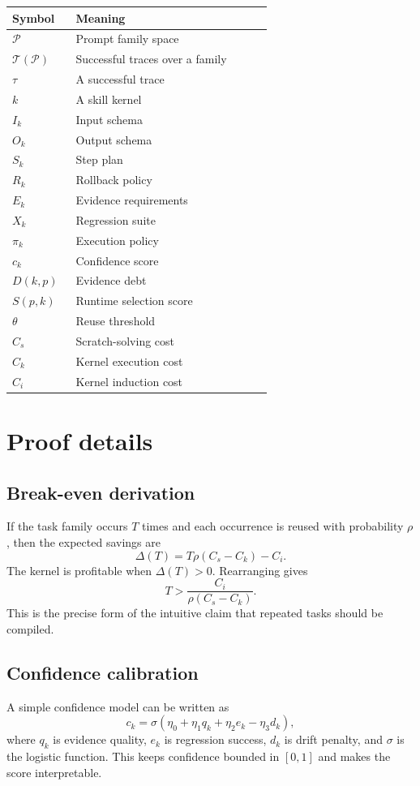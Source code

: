 \documentclass{article}
\begin{document}
\begin{longtable}{p{0.22\linewidth} p{0.68\linewidth}}
\toprule
Symbol & Meaning \\
\midrule
$\mathcal{P}$ & Prompt family space \\
$\mathcal{T}(\mathcal{P})$ & Successful traces over a family \\
$\tau$ & A successful trace \\
$k$ & A skill kernel \\
$I_k$ & Input schema \\
$O_k$ & Output schema \\
$S_k$ & Step plan \\
$R_k$ & Rollback policy \\
$E_k$ & Evidence requirements \\
$X_k$ & Regression suite \\
$\pi_k$ & Execution policy \\
$c_k$ & Confidence score \\
$D(k,p)$ & Evidence debt \\
$S(p,k)$ & Runtime selection score \\
$\theta$ & Reuse threshold \\
$C_s$ & Scratch-solving cost \\
$C_k$ & Kernel execution cost \\
$C_i$ & Kernel induction cost \\
\bottomrule
\end{longtable}

\section{Proof details}

\subsection{Break-even derivation}
If the task family occurs $T$ times and each occurrence is reused with probability $\rho$, then the expected savings are
\[
\Delta(T)=T\rho(C_s-C_k)-C_i.
\]
The kernel is profitable when $\Delta(T)>0$. Rearranging gives
\[
T > \frac{C_i}{\rho(C_s-C_k)}.
\]
This is the precise form of the intuitive claim that repeated tasks should be compiled.

\subsection{Confidence calibration}
A simple confidence model can be written as
\[
 c_k = \sigma(\eta_0 + \eta_1 q_k + \eta_2 e_k - \eta_3 d_k),
\]
where $q_k$ is evidence quality, $e_k$ is regression success, $d_k$ is drift penalty, and $\sigma$ is the logistic function. This keeps confidence bounded in $[0,1]$ and makes the score interpretable.
\end{document}
